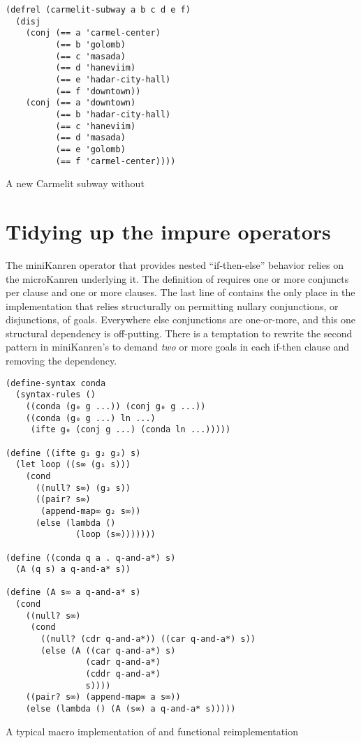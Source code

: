 \documentclass[sigplan,balance,pbalance,natbib=false]{acmart}
\begin{document}
\begin{listing}[h]
  \begin{verbatim}
(defrel (carmelit-subway a b c d e f)
  (disj
    (conj (== a 'carmel-center)
          (== b 'golomb)
          (== c 'masada)
          (== d 'haneviim)
          (== e 'hadar-city-hall)
          (== f 'downtown))
    (conj (== a 'downtown)
          (== b 'hadar-city-hall)
          (== c 'haneviim)
          (== d 'masada)
          (== e 'golomb)
          (== f 'carmel-center))))
  \end{verbatim}
  \caption{A new Carmelit subway without }\label{mnt:new-carmelit}
\end{listing}

\section{Tidying up the impure operators}\label{sec:impure}

The miniKanren  operator that provides nested
\enquote{if-then-else} behavior relies on the
microKanren  underlying it. The definition
of  requires one or more conjuncts per clause and
one or more clauses. The last line of  contains the
only place in the implementation that relies structurally on
permitting nullary conjunctions, or disjunctions, of goals. Everywhere
else conjunctions are one-or-more, and this one structural dependency
is off-putting. There is a temptation to rewrite the second pattern in
miniKanren's  to demand \emph{two} or more goals in
each if-then clause and removing the dependency.

\begin{listing}
  \begin{verbatim}
(define-syntax conda
  (syntax-rules ()
    ((conda (g₀ g ...)) (conj g₀ g ...))
    ((conda (g₀ g ...) ln ...)
     (ifte g₀ (conj g ...) (conda ln ...)))))

(define ((ifte g₁ g₂ g₃) s)
  (let loop ((s∞ (g₁ s)))
    (cond
      ((null? s∞) (g₃ s))
      ((pair? s∞)
       (append-map∞ g₂ s∞))
      (else (lambda ()
              (loop (s∞)))))))

(define ((conda q a . q-and-a*) s)
  (A (q s) a q-and-a* s))

(define (A s∞ a q-and-a* s)
  (cond
    ((null? s∞)
     (cond
       ((null? (cdr q-and-a*)) ((car q-and-a*) s))
       (else (A ((car q-and-a*) s)
                (cadr q-and-a*)
                (cddr q-and-a*)
                s))))
    ((pair? s∞) (append-map∞ a s∞))
    (else (lambda () (A (s∞) a q-and-a* s)))))
  \end{verbatim}
  \caption{A typical macro implementation of  and functional reimplementation}\label{mnt:conda-implementation}
\end{listing}
\end{document}
